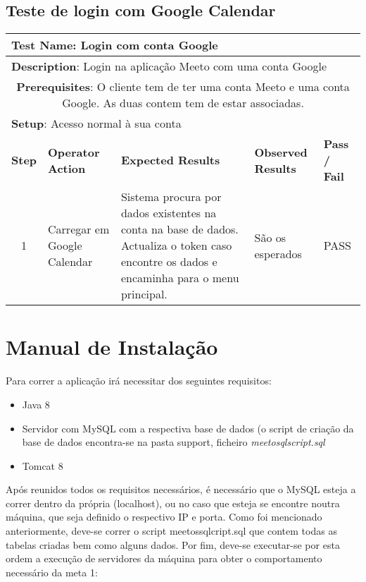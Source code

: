 \documentclass[12pt]{article} %
\begin{document}
\subsection{Teste de login com Google Calendar}
\begin{table}[ht!]
	\begin{tabular}{|c|p{4cm}|p{4cm}|p{3cm}|p{1cm}|}
		\hline
		\multicolumn{5}{|l|}{\textbf{Test Name}: Login com conta Google}\\
		\hline
		\multicolumn{5}{|l|}{\textbf{Description}: Login na aplicação Meeto com uma conta Google}\\
		\hline
		\multicolumn{5}{|p{14,5cm}|}{\textbf{Prerequisites}: O cliente tem de ter uma conta Meeto e uma conta Google. As duas contem tem de estar associadas.}\\
		\hline
		\multicolumn{5}{|l|}{\textbf{Setup}: Acesso normal à sua conta}\\
		\hline
		\textbf{Step} & \textbf{Operator Action} & \textbf{Expected Results} & \textbf{Observed Results} & \textbf{Pass / Fail}\\
		\hline
		1 & Carregar em Google Calendar & Sistema procura por dados existentes na conta na base de dados. Actualiza o token caso encontre os dados e encaminha para o menu principal. & São os esperados & PASS\\
		\hline
	\end{tabular}
\end{table}


\newpage
\section{Manual de Instalação}
\label{sec:install}
Para correr a aplicação irá necessitar dos seguintes requisitos:
\begin{itemize}
	\item Java 8
	\item Servidor com MySQL com a respectiva base de dados (o script de criação da base de dados encontra-se na pasta support, ficheiro \emph{meetosqlscript.sql}
	\item Tomcat 8
\end{itemize}

Após reunidos todos os requisitos necessários, é necessário que o MySQL esteja a correr dentro da própria (localhost), ou no caso que esteja se encontre noutra máquina, que seja definido o respectivo IP e porta.
Como foi mencionado anteriormente, deve-se correr o script {meetossqlcript.sql} que contem todas as tabelas criadas bem como alguns dados.
Por fim, deve-se executar-se por esta ordem a execução de servidores da máquina para obter o comportamento necessário da meta 1:
\end{document}
